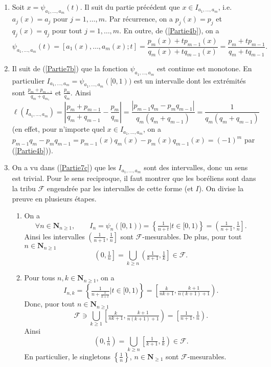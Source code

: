 \documentclass[french]{article}
\theoremstyle{definition}
\newcommand{\set}[1]{\left\{#1\right\}}
\newcommand{\oin}[1]{\left(#1\right)}
\newcommand{\olin}[1]{\left(#1\right]}
\newcommand{\orin}[1]{\left[#1\right)}
\newcommand{\abs}[1]{\left|#1\right|}
\newcommand{\Nbb}{\mathbf{N}}
\newcommand{\Fcal}{\mathcal{F}}
\begin{document}
\begin{enumerate}
\begin{enumerate}
            \item \label{Partie7b}
                Soit $x = \psi_{a_1,\ldots,a_m}(t)$. Il suit du partie pr\'ec\'edent que $x \in I_{a_1,\ldots,a_m}$, i.e. $a_j(x) = a_j$ pour $j=1,\ldots,m$. Par r\'ecurrence, on a $p_j(x) = p_j$ et $q_j(x) = q_j$ pour tout $j = 1,\ldots,m$. En outre, de (\ref{Partie4b}), on a
                    $$\psi_{a_1,\ldots,a_m}(t) = [a_1(x),\ldots,a_m(x);t] = \frac{p_m(x) + tp_{m-1}(x)}{q_m(x) + tq_{m-1}(x)} = \frac{p_m + tp_{m-1}}{q_m + tq_{m-1}}.$$
            \item \label{Partie7c}
                Il suit de (\ref{Partie7b}) que la fonction $\psi_{a_1,\ldots,a_m}$ est continue est monotone. En particulier $I_{a_1,\ldots,a_m} = \psi_{a_1,\ldots,a_m}([0,1))$ est un intervalle dont les extr\'emit\'es sont $\frac{p_m + p_{m-1}}{q_m + q_{m_1}}$ et $\frac{p_m}{q_m}$. Ainsi
                    $$\ell(I_{a_1,\ldots,a_m}) = \abs{\frac{p_m + p_{m-1}}{q_m + q_{m-1}} - \frac{p_m}{q_m}} = \frac{\abs{p_{m-1}q_m - p_m q_{m-1}}}{q_m(q_m + q_{m-1})} = \frac{1}{q_m(q_m + q_{m-1})}$$
                (en effet, pour n'importe quel $x \in I_{a_1,\ldots,a_m}$, on a $p_{m-1}q_m - p_mq_{m-1} = p_{m-1}(x)q_m(x) - p_m(x)q_{m-1}(x) = (-1)^m$ par (\ref{Partie4b})).
                
            \item \label{Partie7d} On a vu dans (\ref{Partie7c}) que les $I_{a_1,\ldots,a_m}$ sont des intervalles, donc un sens est trivial. Pour le sens reciproque, il faut montrer que les bor\'eliens sont dans la tribu $\Fcal$ engendr\'ee par les intervalles de cette forme (et $I$). On divise la preuve en plusieurs \'etapes.
            \begin{enumerate}
                \item On a $$\forall n \in \Nbb_{n \ge 1}, \qquad I_n = \psi_n([0,1)) = \set{\tfrac{1}{n+t} | t \in [0,1)} = \olin{\tfrac{1}{n+1},\tfrac{1}{n}}.$$
                Ainsi les intervalles $\olin{\tfrac{1}{n+1},\tfrac{1}{n}}$ sont $\Fcal$-mesurables. De plus, pour tout $n \in \Nbb_{n \ge 1}$
                    $$\olin{0,\tfrac{1}{n}} = \bigcup_{k \ge n} \olin{\tfrac{1}{k+1},\tfrac{1}{k}} \in \Fcal.$$
                    
                \item Pour tous $n, k \in \Nbb_{n \ge 1}$, on a
                    $$I_{n,k} = \set{\tfrac{1}{n + \frac{1}{k+t}} | t \in [0,1)} = \orin{\tfrac{k}{nk+1}, \tfrac{k+1}{n(k+1)+1}}.$$
                Donc, puor tout $n \in \Nbb_{n \ge 1}$
                    $$\Fcal \owns \bigcup_{k \ge 1}  \orin{\tfrac{k}{nk+1}, \tfrac{k+1}{n(k+1)+1}} = \orin{\tfrac{1}{n+1},\tfrac{1}{n}}.$$
                Ainsi
                    $$\oin{0,\tfrac{1}{n}} = \bigcup_{k \ge n} \orin{\tfrac{1}{k+1},\tfrac{1}{k}} \in \Fcal.$$
                En particulier, le singletons $\set{\tfrac{1}{n}}$, $n \in \Nbb_{\ge 1}$ sont $\Fcal$-mesurables.
                

\end{enumerate}
\end{enumerate}
\end{enumerate}
\end{document}

